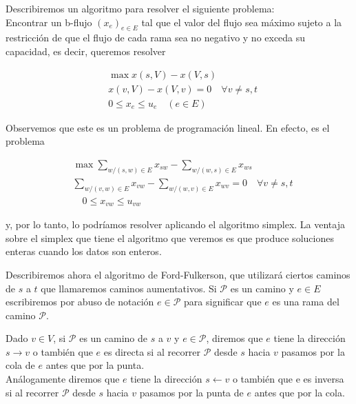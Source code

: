 \documentclass[10pt]{article}
\begin{document}
Describiremos un algoritmo para resolver el siguiente problema:\\
Encontrar un b-flujo $\left(x_{e}\right)_{e \in E}$ tal que el valor del flujo sea máximo sujeto a la restricción de que el flujo de cada rama sea no negativo y no exceda su capacidad, es decir, queremos resolver

$$
\begin{aligned}
& \max x(s, V)-x(V, s) \\
& x(v, V)-x(V, v)=0 \quad \forall v \neq s, t \\
& 0 \leq x_{e} \leq u_{e} \quad(e \in E)
\end{aligned}
$$

Observemos que este es un problema de programación lineal. En efecto, es el problema

$$
\begin{aligned}
& \max \sum_{w /(s, w) \in E} x_{s w}-\sum_{w /(w, s) \in E} x_{w s} \\
& \sum_{w /(v, w) \in E} x_{v w}-\sum_{w /(w, v) \in E} x_{w v}=0 \quad \forall v \neq s, t \\
& \quad 0 \leq x_{v w} \leq u_{v w}
\end{aligned}
$$

y, por lo tanto, lo podríamos resolver aplicando el algoritmo simplex. La ventaja sobre el simplex que tiene el algoritmo que veremos es que produce soluciones enteras cuando los datos son enteros.

Describiremos ahora el algoritmo de Ford-Fulkerson, que utilizará ciertos caminos de $s$ a $t$ que llamaremos caminos aumentativos. Si $\mathcal{P}$ es un camino y $e \in E$ escribiremos por abuso de notación $e \in \mathcal{P}$ para significar que $e$ es una rama del camino $\mathcal{P}$.

Dado $v \in V$, si $\mathcal{P}$ es un camino de $s$ a $v$ y $e \in \mathcal{P}$, diremos que $e$ tiene la dirección $s \longrightarrow v$ o también que $e$ es directa si al recorrer $\mathcal{P}$ desde $s$ hacia $v$ pasamos por la cola de $e$ antes que por la punta.\\
Análogamente diremos que $e$ tiene la dirección $s \longleftarrow v$ o también que e es inversa si al recorrer $\mathcal{P}$ desde $s$ hacia $v$ pasamos por la punta de $e$ antes que por la cola.
\end{document}

